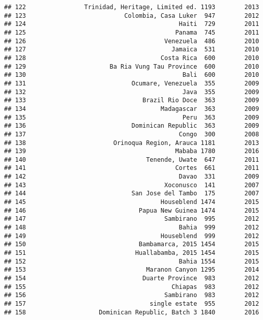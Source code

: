 \documentclass[
]{article}
\begin{document}
\begin{verbatim}
## 122                Trinidad, Heritage, Limited ed. 1193        2013
## 123                           Colombia, Casa Luker  947        2012
## 124                                          Haiti  729        2011
## 125                                         Panama  745        2011
## 126                                      Venezuela  486        2010
## 127                                        Jamaica  531        2010
## 128                                     Costa Rica  600        2010
## 129                       Ba Ria Vung Tau Province  600        2010
## 130                                           Bali  600        2010
## 131                             Ocumare, Venezuela  355        2009
## 132                                           Java  355        2009
## 133                                Brazil Rio Doce  363        2009
## 134                                     Madagascar  363        2009
## 135                                           Peru  363        2009
## 136                             Dominican Republic  363        2009
## 137                                          Congo  300        2008
## 138                        Orinoqua Region, Arauca 1181        2013
## 139                                         Mababa 1780        2016
## 140                                 Tenende, Uwate  647        2011
## 141                                         Cortes  661        2011
## 142                                          Davao  331        2009
## 143                                      Xoconusco  141        2007
## 144                             San Jose del Tambo  175        2007
## 145                                     Houseblend 1474        2015
## 146                               Papua New Guinea 1474        2015
## 147                                      Sambirano  995        2012
## 148                                          Bahia  999        2012
## 149                                     Houseblend  999        2012
## 150                               Bambamarca, 2015 1454        2015
## 151                              Huallabamba, 2015 1454        2015
## 152                                          Bahia 1554        2015
## 153                                 Maranon Canyon 1295        2014
## 154                                Duarte Province  983        2012
## 155                                        Chiapas  983        2012
## 156                                      Sambirano  983        2012
## 157                                  single estate  955        2012
## 158                    Dominican Republic, Batch 3 1840        2016

\end{verbatim}
\end{document}
